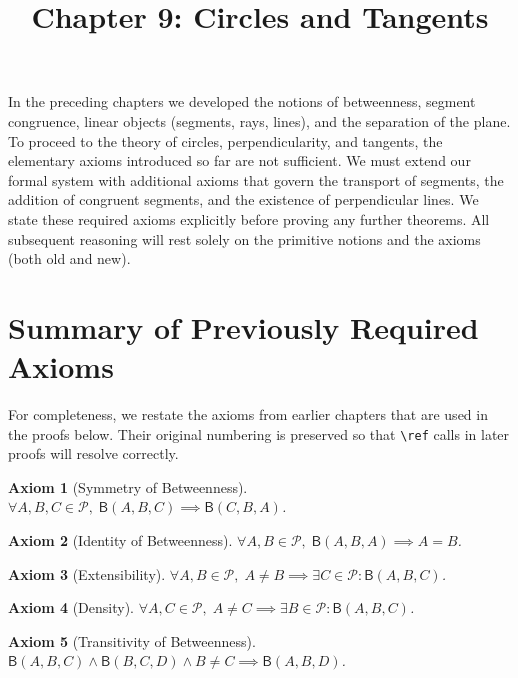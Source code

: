 \documentclass[12pt]{article}
\title{Chapter 9: Circles and Tangents}
\author{}
\date{}
\newtheorem{axiom}{Axiom}[section]
\newcommand{\rel}[1]{\mathsf{B}(#1)}
\begin{document}
\maketitle

In the preceding chapters we developed the notions of betweenness, segment congruence, linear objects (segments, rays, lines), and the separation of the plane. To proceed to the theory of circles, perpendicularity, and tangents, the elementary axioms introduced so far are not sufficient. We must extend our formal system with additional axioms that govern the transport of segments, the addition of congruent segments, and the existence of perpendicular lines. We state these required axioms explicitly before proving any further theorems. All subsequent reasoning will rest solely on the primitive notions and the axioms (both old and new).

\section{Summary of Previously Required Axioms}
\label{sec:old-axioms}

For completeness, we restate the axioms from earlier chapters that are used in the proofs below. Their original numbering is preserved so that \verb|\ref| calls in later proofs will resolve correctly.

\begin{axiom}[Symmetry of Betweenness]
\label{ax:bet-sym}
$\forall A,B,C\in\mathcal{P},\; \rel{A,B,C} \implies \rel{C,B,A}$.
\end{axiom}

\begin{axiom}[Identity of Betweenness]
\label{ax:bet-id}
$\forall A,B\in\mathcal{P},\; \rel{A,B,A} \implies A = B$.
\end{axiom}

\begin{axiom}[Extensibility]
\label{ax:bet-ext}
$\forall A,B\in\mathcal{P},\; A\neq B \implies \exists C\in\mathcal{P}: \rel{A,B,C}$.
\end{axiom}

\begin{axiom}[Density]
\label{ax:bet-dense}
$\forall A,C\in\mathcal{P},\; A\neq C \implies \exists B\in\mathcal{P}: \rel{A,B,C}$.
\end{axiom}

\begin{axiom}[Transitivity of Betweenness]
\label{ax:bet-trans}
$\rel{A,B,C} \land \rel{B,C,D} \land B\neq C \implies \rel{A,B,D}$.
\end{axiom}
\end{document}
